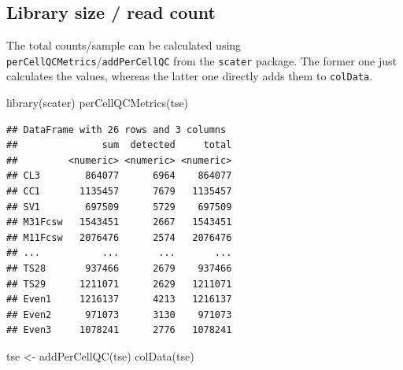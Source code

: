 \documentclass[
]{book}
\newenvironment{Shaded}{\begin{snugshade}}{\end{snugshade}}
\newcommand{\FunctionTok}[1]{\textcolor[rgb]{0.00,0.00,0.00}{#1}}
\newcommand{\NormalTok}[1]{#1}
\newcommand{\OtherTok}[1]{\textcolor[rgb]{0.56,0.35,0.01}{#1}}
\begin{document}
\hypertarget{library-size-read-count}{%
\subsection{Library size / read count}\label{library-size-read-count}}

The total counts/sample can be calculated using \texttt{perCellQCMetrics}/\texttt{addPerCellQC} from the \texttt{scater} package. The former one
just calculates the values, whereas the latter one directly adds them to
\texttt{colData}.

\begin{Shaded}
\begin{Highlighting}[]
\FunctionTok{library}\NormalTok{(scater)}
\FunctionTok{perCellQCMetrics}\NormalTok{(tse)}
\end{Highlighting}
\end{Shaded}

\begin{verbatim}
## DataFrame with 26 rows and 3 columns
##               sum  detected     total
##         <numeric> <numeric> <numeric>
## CL3        864077      6964    864077
## CC1       1135457      7679   1135457
## SV1        697509      5729    697509
## M31Fcsw   1543451      2667   1543451
## M11Fcsw   2076476      2574   2076476
## ...           ...       ...       ...
## TS28       937466      2679    937466
## TS29      1211071      2629   1211071
## Even1     1216137      4213   1216137
## Even2      971073      3130    971073
## Even3     1078241      2776   1078241
\end{verbatim}

\begin{Shaded}
\begin{Highlighting}[]
\NormalTok{tse }\OtherTok{\textless{}{-}} \FunctionTok{addPerCellQC}\NormalTok{(tse)}
\FunctionTok{colData}\NormalTok{(tse)}
\end{Highlighting}
\end{Shaded}
\end{document}
